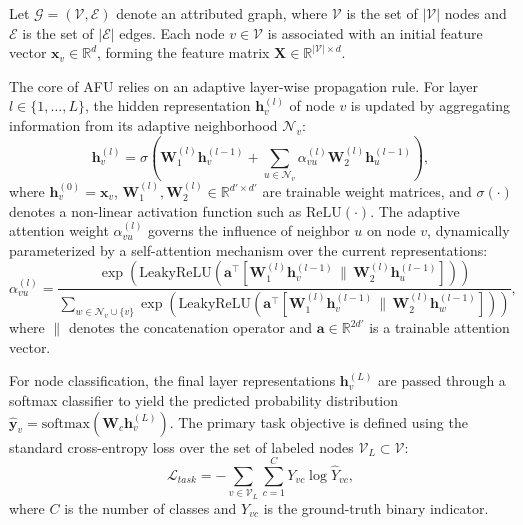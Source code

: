 \documentclass[10pt,twocolumn]{article}
\begin{document}
Let $\mathcal{G} = (\mathcal{V}, \mathcal{E})$ denote an attributed graph, where $\mathcal{V}$ is the set of $|\mathcal{V}|$ nodes and $\mathcal{E}$ is the set of $|\mathcal{E}|$ edges. Each node $v \in \mathcal{V}$ is associated with an initial feature vector $\mathbf{x}_v \in \mathbb{R}^{d}$, forming the feature matrix $\mathbf{X} \in \mathbb{R}^{|\mathcal{V}| \times d}$. 

The core of \textsc{AFU} relies on an adaptive layer-wise propagation rule. For layer $l \in \{1, \dots, L\}$, the hidden representation $\mathbf{h}_v^{(l)}$ of node $v$ is updated by aggregating information from its adaptive neighborhood $\mathcal{N}_v$:
\begin{equation}
    \mathbf{h}_v^{(l)} = \sigma \left( \mathbf{W}_1^{(l)} \mathbf{h}_v^{(l-1)} + \sum_{u \in \mathcal{N}_v} \alpha_{vu}^{(l)} \mathbf{W}_2^{(l)} \mathbf{h}_u^{(l-1)} \right),
\end{equation}
where $\mathbf{h}_v^{(0)} = \mathbf{x}_v$, $\mathbf{W}_1^{(l)}, \mathbf{W}_2^{(l)} \in \mathbb{R}^{d' \times d'}$ are trainable weight matrices, and $\sigma(\cdot)$ denotes a non-linear activation function such as $\text{ReLU}(\cdot)$. The adaptive attention weight $\alpha_{vu}^{(l)}$ governs the influence of neighbor $u$ on node $v$, dynamically parameterized by a self-attention mechanism over the current representations:
\begin{equation}
    \alpha_{vu}^{(l)} = \frac{\exp\left(\text{LeakyReLU}\left(\mathbf{a}^\top \left[ \mathbf{W}_1^{(l)} \mathbf{h}_v^{(l-1)} \,\|\, \mathbf{W}_2^{(l)} \mathbf{h}_u^{(l-1)} \right]\right)\right)}{\sum_{w \in \mathcal{N}_v \cup \{v\}} \exp\left(\text{LeakyReLU}\left(\mathbf{a}^\top \left[ \mathbf{W}_1^{(l)} \mathbf{h}_v^{(l-1)} \,\|\, \mathbf{W}_2^{(l)} \mathbf{h}_w^{(l-1)} \right]\right)\right)},
\end{equation}
where $\|$ denotes the concatenation operator and $\mathbf{a} \in \mathbb{R}^{2d'}$ is a trainable attention vector.

For node classification, the final layer representations $\mathbf{h}_v^{(L)}$ are passed through a softmax classifier to yield the predicted probability distribution $\hat{\mathbf{y}}_v = \text{softmax}(\mathbf{W}_c \mathbf{h}_v^{(L)})$. The primary task objective is defined using the standard cross-entropy loss over the set of labeled nodes $\mathcal{V}_L \subset \mathcal{V}$:
\begin{equation}
    \mathcal{L}_{task} = -\sum_{v \in \mathcal{V}_L} \sum_{c=1}^{C} Y_{vc} \log \hat{Y}_{vc},
\end{equation}
where $C$ is the number of classes and $Y_{vc}$ is the ground-truth binary indicator.
\end{document}
